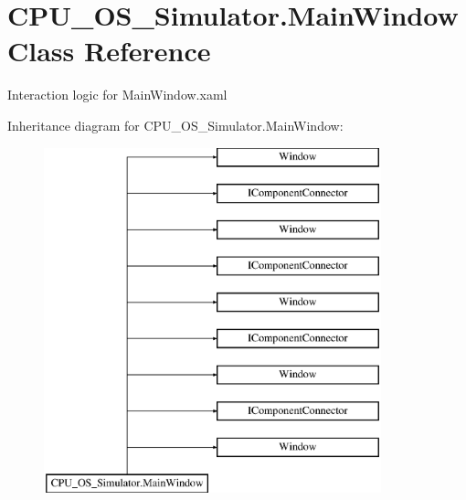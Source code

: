 \hypertarget{class_c_p_u___o_s___simulator_1_1_main_window}{}\section{C\+P\+U\+\_\+\+O\+S\+\_\+\+Simulator.\+Main\+Window Class Reference}
\label{class_c_p_u___o_s___simulator_1_1_main_window}


Interaction logic for Main\+Window.\+xaml  


Inheritance diagram for C\+P\+U\+\_\+\+O\+S\+\_\+\+Simulator.\+Main\+Window\+:\begin{figure}[H]
\begin{center}
\leavevmode
\includegraphics[height=10.000000cm]{class_c_p_u___o_s___simulator_1_1_main_window}
\end{center}
\end{figure}
